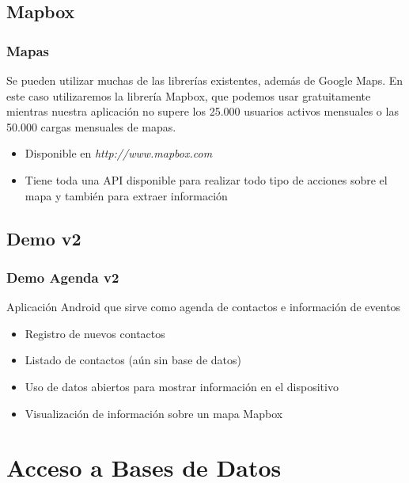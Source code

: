 \documentclass[xcolor={dvipsnames}]{beamer}
\begin{document}
\subsection{Mapbox}
\begin{frame}\frametitle{Mapas}
    \begin{block}{}
    Se pueden utilizar muchas de las librerías existentes, además de Google Maps. En este caso utilizaremos la librería Mapbox, que podemos
    usar gratuitamente mientras nuestra aplicación no supere los 25.000 usuarios activos mensuales o las 50.000 cargas mensuales de mapas.
    \end{block}
    \begin{itemize}
        \item Disponible en \emph{http://www.mapbox.com} 
        \item Tiene toda una API disponible para realizar todo tipo de acciones sobre el mapa y también para extraer información
    \end{itemize}
\end{frame}

\subsection{Demo v2}
\begin{frame}\frametitle{Demo Agenda v2}
    
    Aplicación Android que sirve como agenda de contactos e información de eventos

    \begin{itemize}
        \item Registro de nuevos contactos
        \item Listado de contactos (aún sin base de datos)
        \item Uso de datos abiertos para mostrar información en el dispositivo
        \item Visualización de información sobre un mapa Mapbox
    \end{itemize}
\end{frame}

\section{Acceso a Bases de Datos}
\end{document}
